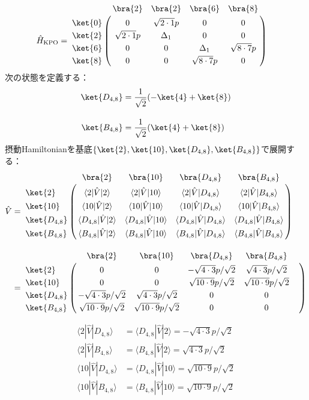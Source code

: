 \begin{align}
     \hat{H}_{\rm{KPO}}
    &=
   \bordermatrix{     
    & \bra{2} &  \bra{2} &  \bra{6}&  \bra{8}\cr
   \ket{0}&0&\sqrt{2\cdot1}p&0&0\cr
  \ket{2}&\sqrt{2\cdot1}p&\Delta_1&0&0\cr
  \ket{6}&0&0&\Delta_1&\sqrt{8\cdot7}p\cr
  \ket{8}&0&0&\sqrt{8\cdot7}p&0\cr
            }
\end{align}
次の状態を定義する：
\begin{align}
    \ket{D_{4,8}} &= \frac{1}{\sqrt{2}}(-\ket{4}+\ket{8})\\[10pt]
    \ket{B_{4,8}} &= \frac{1}{\sqrt{2}}(\ket{4}+\ket{8})
\end{align}
摂動Hamiltonianを基底$\{\ket{2},\ket{10},\ket{D_{4,8}},\ket{B_{4,8}}\}$で展開する：
\begin{align}
     \hat{V}
    &=
   \bordermatrix{     
    & \bra{2} &  \bra{10} &  \bra{D_{4,8}}&  \bra{B_{4,8}}\cr
   \ket{2}&\langle{2|\hat{V}|2}\rangle&\langle{2|\hat{V}|10}\rangle&\langle{2|\hat{V}|D_{4,8}}\rangle
   &\langle{2|\hat{V}|B_{4,8}}\rangle\cr
  \ket{10}&\langle{10|\hat{V}|2}\rangle&\langle{10|\hat{V}|10}\rangle&\langle{10|\hat{V}|D_{4,8}}\rangle
   &\langle{10|\hat{V}|B_{4,8}}\rangle\cr
  \ket{D_{4,8}}&\langle{D_{4,8}|\hat{V}|2}\rangle&\langle{D_{4,8}|\hat{V}|10}\rangle&\langle{D_{4,8}|\hat{V}|D_{4,8}}\rangle
   &\langle{D_{4,8}|\hat{V}|B_{4,8}}\rangle\cr
  \ket{B_{4,8}}&\langle{B_{4,8}|\hat{V}|2}\rangle&\langle{B_{4,8}|\hat{V}|10}\rangle&\langle{B_{4,8}|\hat{V}|D_{4,8}}\rangle
   &\langle{B_{4,8}|\hat{V}|B_{4,8}}\rangle\cr
    }\\[10pt]
    &=
   \bordermatrix{     
   & \bra{2} &  \bra{10} &  \bra{D_{4,8}}&  \bra{B_{4,8}}\cr
   \ket{2}&0&0&-\sqrt{4\cdot3}p/\sqrt{2}&\sqrt{4\cdot3}p/\sqrt{2}\cr
  \ket{10}&0&0&\sqrt{10\cdot9}p/\sqrt{2}&\sqrt{10\cdot9}p/\sqrt{2}\cr
  \ket{D_{4,8}}&-\sqrt{4\cdot3}p/\sqrt{2}&\sqrt{4\cdot3}p/\sqrt{2}&0&0\cr
  \ket{B_{4,8}}&\sqrt{10\cdot9}p/\sqrt{2}&\sqrt{10\cdot9}p/\sqrt{2}&0&0&\cr
            }
\end{align}

\begin{align}
    \langle{2|\hat{V}|D_{4,8}}\rangle&=\langle{D_{4,8}|\hat{V}|2}\rangle
    =-\sqrt{4\cdot3}p/\sqrt{2}\\[10pt]
    \langle{2|\hat{V}|B_{4,8}}\rangle&=\langle{B_{4,8}|\hat{V}|2}\rangle
    =\sqrt{4\cdot3}p/\sqrt{2}\\[10pt]
    \langle{10|\hat{V}|D_{4,8}}\rangle&=\langle{D_{4,8}|\hat{V}|10}\rangle
    =\sqrt{10\cdot9}p/\sqrt{2}\\[10pt]
   \langle{10|\hat{V}|B_{4,8}}\rangle&=\langle{B_{4,8}|\hat{V}|10}\rangle
   =\sqrt{10\cdot9}p/\sqrt{2}
\end{align}


